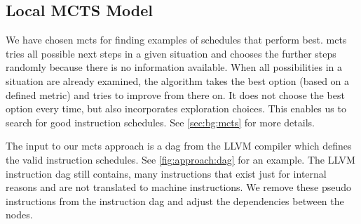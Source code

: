 \subsection{Local MCTS Model}
\label{subsec:bg:ml:mcts}
We have chosen \ac{mcts} for finding examples of schedules that perform best.
\ac{mcts} tries all possible next steps in a given situation and chooses the further steps randomly because there is no information available.
When all possibilities in a situation are already examined, the algorithm takes the best option (based on a defined metric) and tries to improve from there on.
It does not choose the best option every time, but also incorporates exploration choices.
This enables us to search for good instruction schedules.
See \cref{sec:bg:mcts} for more details.

The input to our \ac{mcts} approach is a \ac{dag} from the LLVM compiler which defines the valid instruction schedules.
See \cref{fig:approach:dag} for an example.
The LLVM instruction \ac{dag} still contains, many instructions that exist just for internal reasons and are not translated to machine instructions.
We remove these pseudo instructions from the instruction \ac{dag} and adjust the dependencies between the nodes.

